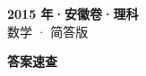 \documentclass[zihao=-4, a4paper]{ctexart}
\begin{document}
\begin{center}
  {\Large\bfseries 2015 年·安徽卷·理科}\\[4pt]
  {\large 数学 · 简答版}
\end{center}
\medskip
{}

\clearpage
{}
\begin{center}{\Large\bfseries 答案速查}\end{center}
\medskip

\end{document}
